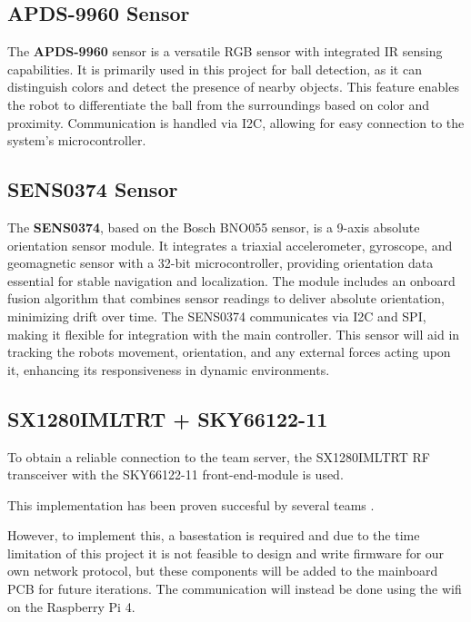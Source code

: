 \documentclass[a4paper,8pt]{article}
\begin{document}
\subsection{APDS-9960 Sensor}

The \textbf{APDS-9960} sensor is a versatile RGB sensor with integrated IR sensing capabilities. It is primarily used in this project for ball detection, as it can distinguish colors and detect the presence of nearby objects. This feature enables the robot to differentiate the ball from the surroundings based on color and proximity. Communication is handled via I2C, allowing for easy connection to the system’s microcontroller.

\subsection{SENS0374 Sensor}

  The \textbf{SENS0374}, based on the Bosch BNO055 sensor, is a 9-axis absolute orientation sensor module. It integrates a triaxial accelerometer, gyroscope, and geomagnetic sensor with a 32-bit microcontroller, providing orientation data essential for stable navigation and localization. The module includes an onboard fusion algorithm that combines sensor readings to deliver absolute orientation, minimizing drift over time. The SENS0374 communicates via I2C and SPI, making it flexible for integration with the main controller. This sensor will aid in tracking the robots movement, orientation, and any external forces acting upon it, enhancing its responsiveness in dynamic environments.

\subsection{SX1280IMLTRT + SKY66122-11}

To obtain a reliable connection to the team server, the SX1280IMLTRT RF transceiver with the SKY66122-11
front-end-module is used.

This implementation has been proven succesful by several teams \cite{ryllExtendedTeamDescription}\cite{barretoRoboIMEIgnitingInnovation}.

However, to implement this, a basestation is required and due to the time limitation of this project it is not feasible to design and write firmware for our own network protocol, but these components will be added to the mainboard PCB for future iterations. The communication will instead be done using the wifi on the Raspberry Pi 4.
\end{document}
